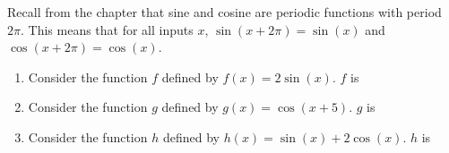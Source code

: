 \documentclass{ximera}
\author{Kenneth Berglund}
\begin{document}
\begin{exercise}
Recall from the chapter that sine and cosine are periodic functions with period $2\pi$. This means that for all inputs $x$, $\sin(x + 2\pi) = \sin(x)$ and $\cos(x + 2\pi) = \cos(x)$. 

\begin{enumerate}
\item Consider the function $f$ defined by $f(x) = 2\sin(x)$. $f$ is
\begin{multipleChoice}
\end{multipleChoice}

\item Consider the function $g$ defined by $g(x) = \cos(x + 5)$. $g$ is
\begin{multipleChoice}
\end{multipleChoice}

\item Consider the function $h$ defined by $h(x) = \sin(x) + 2\cos(x)$. $h$ is
\begin{multipleChoice}
\end{multipleChoice}
\end{enumerate}

\end{exercise}
\end{document}
